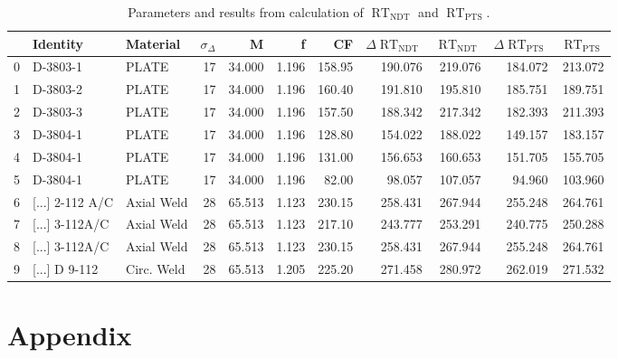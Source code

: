 \documentclass{article}
\begin{document}
    \begin{table}
    \label{table:rt_values}
    \caption{Parameters and results from calculation of $\operatorname{RT}_{\operatorname{NDT}}$ and $\operatorname{RT}_{\operatorname{PTS}}$.}
    \begin{tabular}{lllrrrrrrrr}
        \toprule
        {} &                                  Identity &              Material &  $\sigma_\Delta$ &      M &    f &     CF &  $\Delta\operatorname{RT}_{\operatorname{NDT}}$ &  $\operatorname{RT}_{\operatorname{NDT}}$  & $\Delta\operatorname{RT}_{\operatorname{PTS}}$  &  $\operatorname{RT}_{\operatorname{PTS}}$ \\
        \midrule
        0 &                                  D-3803-1 &                 PLATE &   17 & 34.000 & 1.196 & 158.95 &  190.076 & 219.076 &  184.072 & 213.072 \\
        1 &                                  D-3803-2 &                 PLATE &   17 & 34.000 & 1.196 & 160.40 &  191.810 & 195.810 &  185.751 & 189.751 \\
        2 &                                  D-3803-3 &                 PLATE &   17 & 34.000 & 1.196 & 157.50 &  188.342 & 217.342 &  182.393 & 211.393 \\
        3 &                                  D-3804-1 &                 PLATE &   17 & 34.000 & 1.196 & 128.80 &  154.022 & 188.022 &  149.157 & 183.157 \\
        4 &                                  D-3804-1 &                 PLATE &   17 & 34.000 & 1.196 & 131.00 &  156.653 & 160.653 &  151.705 & 155.705 \\
        5 &                                  D-3804-1 &                 PLATE &   17 & 34.000 & 1.196 &  82.00 &   98.057 & 107.057 &   94.960 & 103.960 \\
        6 &  [...] 2-112 A/C &            Axial Weld &   28 & 65.513 & 1.123 & 230.15 &  258.431 & 267.944 &  255.248 & 264.761 \\
        7 &          [...] 3-112A/C &            Axial Weld &   28 & 65.513 & 1.123 & 217.10 &  243.777 & 253.291 &  240.775 & 250.288 \\
        8 &          [...] 3-112A/C &            Axial Weld &   28 & 65.513 & 1.123 & 230.15 &  258.431 & 267.944 &  255.248 & 264.761 \\
        9 &                [...] D 9-112 &  Circ. Weld &   28 & 65.513 & 1.205 & 225.20 &  271.458 & 280.972 &  262.019 & 271.532 \\
        \bottomrule
        \end{tabular}
    \end{table}
\section{Appendix}
    
\end{document}
